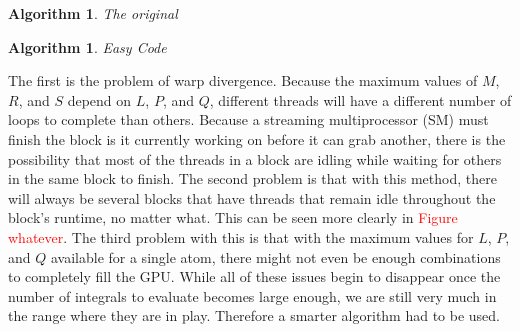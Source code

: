 \documentclass[12pt]{report}
\newcommand{\notetodylan}[1]{\textcolor{red}{#1}} %
\newtheorem{algorithm}[theorem]{Algorithm}
\begin{document}
\begin{algorithm}
\caption{The original }
\label{origcode}
\begin{algorithmic}
				\ELSE
				\ENDIF
					\ELSE
					\ENDIF
					\ENDFOR
				\ENDFOR
			\ENDFOR
		\ENDFOR
	\ENDFOR
\ENDFOR
\end{algorithmic}
\end{algorithm}

\begin{algorithm}
\caption{Easy Code}
\label{easycode}
\begin{algorithmic}

\STATE{}
				\ELSE
				\ENDIF
					\ELSE
					\ENDIF
					\ENDFOR
				\ENDFOR
			\ENDFOR
\ENDIF
\end{algorithmic}
\end{algorithm}

The first is the problem of warp divergence. Because the maximum values of $M$, $R$, and $S$ depend on $L$, $P$, and $Q$, different threads will have a different number of loops to complete than others. Because a streaming multiprocessor (SM) must finish the block is it currently working on before it can grab another, there is the possibility that most of the threads in a block are idling while waiting for others in the same block to finish. The second problem is that with this method, there will always be several blocks that have threads that remain idle throughout the block's runtime, no matter what. This can be seen more clearly in \notetodylan{Figure whatever}. The third problem with this is that with the maximum values for $L$, $P$, and $Q$ available for a single atom, there might not even be enough combinations to completely fill the GPU. While all of these issues begin to disappear once the number of integrals to evaluate becomes large enough, we are still very much in the range where they are in play. Therefore a smarter algorithm had to be used.
\end{document}
